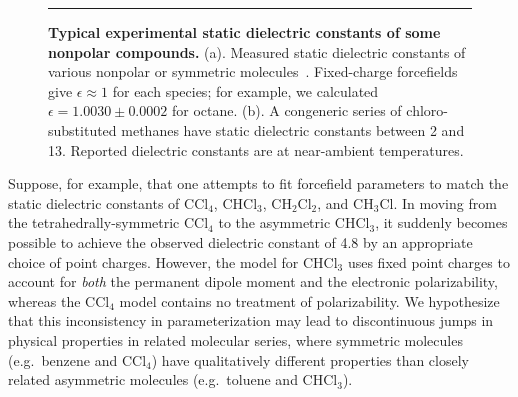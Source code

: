 \documentclass[aip, jcp, reprint]{revtex4-1}  %
\begin{document}
\begin{figure}


\noindent\rule{8cm}{0.4pt}


\caption{{\bf Typical experimental static dielectric constants of some nonpolar compounds.}
(a). Measured static dielectric constants of various nonpolar or symmetric molecules~\cite{d1990dielectric, haynes2011crc}.  
Fixed-charge forcefields give $\epsilon \approx 1$ for each species; for example, we calculated $\epsilon = 1.0030 \pm 0.0002$ for octane.
(b).  A congeneric series of chloro-substituted methanes have static dielectric constants between 2 and 13.  
Reported dielectric constants are at near-ambient temperatures.  
}
\label{figure:nonpolars}

\end{figure}


Suppose, for example, that one attempts to fit forcefield parameters to match the static dielectric constants of $\mathrm{CCl_4}$, $\mathrm{CHCl_3}$, $\mathrm{CH_2Cl_2}$, and $\mathrm{CH_3Cl}$.
In moving from the tetrahedrally-symmetric $\mathrm{CCl_4}$ to the asymmetric $\mathrm{CHCl_3}$, it suddenly becomes possible to achieve the observed dielectric constant of 4.8 by an appropriate choice of point charges.
However, the model for $\mathrm{CHCl_3}$ uses fixed point charges to account for \emph{both} the permanent dipole moment and the electronic polarizability, whereas the $\mathrm{CCl_4}$ model contains no treatment of polarizability.  
We hypothesize that this inconsistency in parameterization may lead to discontinuous jumps in physical properties in related molecular series, where symmetric molecules (e.g.~benzene and $\mathrm{CCl_4}$) have qualitatively different properties than closely related asymmetric molecules (e.g.~toluene and $\mathrm{CHCl_3}$).
\end{document}
